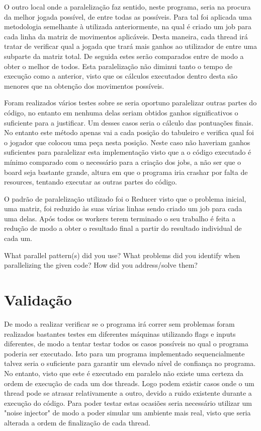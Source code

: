 \documentclass[a4paper]{article}
\begin{document}
O outro local onde a paralelização faz sentido, neste programa, seria na procura da melhor jogada possível, de entre todas as possíveis. Para tal foi aplicada uma metodologia semelhante à utilizada anteriormente, na qual é criado um job para cada linha da matriz de movimentos aplicáveis. Desta maneira, cada thread irá tratar de verificar qual a jogada que trará mais ganhos ao utilizador de entre uma subparte da matriz total. De seguida estes serão comparados entre de modo a obter o melhor de todos. Esta paralelização não diminui tanto o tempo de execução como a anterior, visto que os cálculos executados dentro desta são menores que na obtenção dos movimentos possíveis.

Foram realizados vários testes sobre se seria oportuno paralelizar outras partes do código, no entanto em nenhuma delas seriam obtidos ganhos significativos o suficiente para a justificar. Um desses casos seria o cálculo das pontuações finais. No entanto este método apenas vai a cada posição do tabuleiro e verifica qual foi o jogador que colocou uma peça nesta posição. Neste caso não haveriam ganhos suficientes para paralelizar esta implementação visto que a o código executado é mínimo comparado com o necessário para a criação dos jobs, a não ser que o board seja bastante grande, altura em que o programa iria crashar por falta de resources, tentando executar as outras partes do código.

O padrão de paralelização utilizado foi o Reducer visto que o problema inicial, uma matriz, foi reduzido às suas várias linhas sendo criado um job para cada uma delas. Após todos os workers terem terminado o seu trabalho é feita a redução de modo a obter o resultado final a partir do resultado individual de cada um.   



What	parallel	pattern(s)	did	you	use?	 What	problems	did	you	
identify	 when	 parallelizing	 the	 given	 code?	 	 How	 did	 you	 address/solve	 them?	


\section{Validação}
De modo a realizar verificar se o programa irá correr sem problemas foram realizados bastantes testes em diferentes máquinas utilizando flags e inputs diferentes, de modo a tentar testar todos os casos possíveis no qual o programa poderia ser executado.
Isto para um programa implementado sequencialmente talvez seria o suficiente para garantir um elevado nível de confiança no programa. No entanto, visto que este é executado em paralelo não existe uma certeza da ordem de execução de cada um dos threads. Logo podem existir casos onde o um thread pode se atrasar relativamente a outro, devido a ruido existente durante a execução do código. Para poder testar estas ocasiões seria necessário utilizar um "noise injector" de modo a poder simular um ambiente mais real, visto que seria alterada a ordem de finalização de cada thread.
\end{document}
